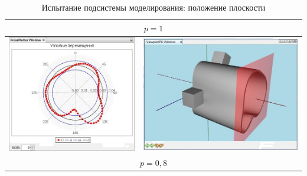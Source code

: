 \documentclass[14pt,oneside,final]{extreport}
\begin{document}
\begin{appendices}
	\begin{table}[]
		\centering
		\caption{Испытание подсистемы моделирования: положение плоскости}
		\label{tab:modeling-plane-tests}{
			{\tabulinesep=1.2mm
				\begin{tabu}[]{|c|c|}
					\hline
					 \\ \hline
					\includegraphics[scale=0.55]{img/plane-position-test1} & \includegraphics[scale=0.55]{img/plane-position-test1-model}  \\ 
					\hline
					 \\ \hline

\end{tabu}}}
\end{table}
\end{appendices}
\end{document}
